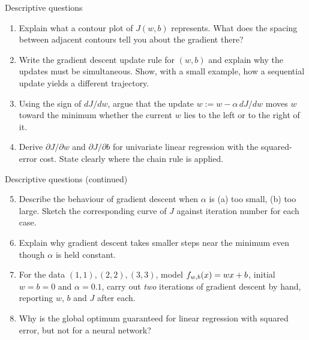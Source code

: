 \documentclass[aspectratio=169,11pt]{beamer}
\begin{document}
\begin{frame}{Descriptive questions}
  \small
  \begin{enumerate}
    \item Explain what a contour plot of $J(w,b)$ represents. What does the
          spacing between adjacent contours tell you about the gradient there?
          \hfill{}
    \item Write the gradient descent update rule for $(w,b)$ and explain why the
          updates must be simultaneous. Show, with a small example, how a
          sequential update yields a different trajectory. \hfill{}
    \item Using the sign of $dJ/dw$, argue that the update
          $w := w-\alpha\,dJ/dw$ moves $w$ toward the minimum whether the current
          $w$ lies to the left or to the right of it. \hfill{}
    \item Derive $\partial J/\partial w$ and $\partial J/\partial b$ for
          univariate linear regression with the squared-error cost. State clearly
          where the chain rule is applied. \hfill{}
  \end{enumerate}
\end{frame}

\begin{frame}{Descriptive questions (continued)}
  \small
  \begin{enumerate}\setcounter{enumi}{4}
    \item Describe the behaviour of gradient descent when $\alpha$ is (a) too
          small, (b) too large. Sketch the corresponding curve of $J$ against
          iteration number for each case. \hfill{}
    \item Explain why gradient descent takes smaller steps near the minimum even
          though $\alpha$ is held constant. \hfill{}
    \item For the data $(1,1),(2,2),(3,3)$, model $f_{w,b}(x)=wx+b$, initial
          $w=b=0$ and $\alpha=0.1$, carry out \emph{two} iterations of gradient
          descent by hand, reporting $w$, $b$ and $J$ after each. \hfill{}
    \item Why is the global optimum guaranteed for linear regression with squared
          error, but not for a neural network? \hfill{}
  \end{enumerate}
\end{frame}
\end{document}
